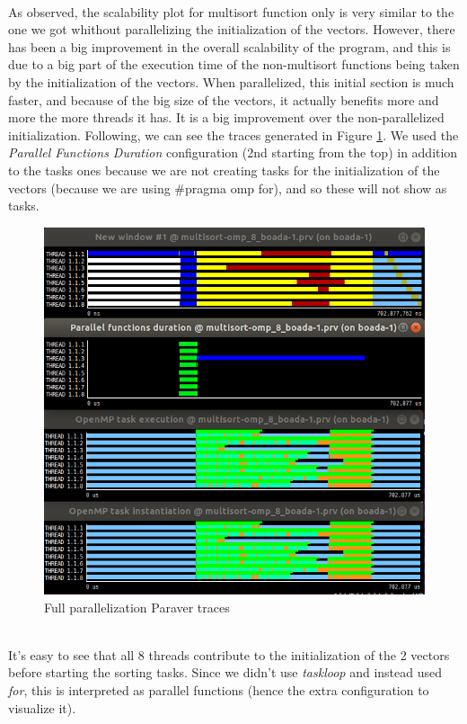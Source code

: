 \documentclass[12]{article}
\begin{document}
\\
As observed, the scalability plot for multisort function only is very similar to the one we got whithout parallelizing the initialization of the vectors. However, there has been a big improvement in the overall scalability of the program, and this is due to a big part of the execution time of the non-multisort functions being taken by the initialization of the vectors. When parallelized, this initial section is much faster, and because of the big size of the vectors, it actually benefits more and more the more threads it has. It is a big improvement over the non-parallelized initialization. Following, we can see the traces generated in Figure \ref{paraverfull}. We used the \textit{Parallel Functions Duration} configuration (2nd starting from the top) in addition to the tasks ones because we are not creating tasks for the initialization of the vectors (because we are using #pragma omp for), and so these will not show as tasks. 
\\
\medskip
\begin{figure}[H]
    \centering
    \includegraphics[scale=0.75]{images/paraverFull.PNG}
    \caption{Full parallelization Paraver traces}
    \label{paraverfull}
\end{figure}
\\
It's easy to see that all 8 threads contribute to the initialization of the 2 vectors before starting the sorting tasks. Since we didn't use \textit{taskloop} and instead used \textit{for}, this is interpreted as parallel functions (hence the extra configuration to visualize it).
\end{document}
